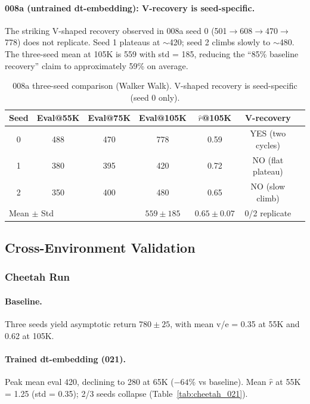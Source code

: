 \documentclass[10pt,letterpaper]{article}
\begin{document}
\paragraph{008a (untrained dt-embedding): V-recovery is seed-specific.}
The striking V-shaped recovery observed in 008a seed 0 (501$\to$608$\to$470$\to$778) does not replicate.
Seed 1 plateaus at $\sim$420; seed 2 climbs slowly to $\sim$480.
The three-seed mean at 105K is 559 with std = 185, reducing the ``85\% baseline recovery'' claim to approximately 59\% on average.

\begin{table}[t]
\centering
\caption{008a three-seed comparison (Walker Walk). V-shaped recovery is seed-specific (seed 0 only).}
\label{tab:008a_seeds}
\small
\begin{tabular}{ccccccl}
\toprule
Seed & Eval@55K & Eval@75K & Eval@105K & $\hat{r}$@105K & V-recovery \\
\midrule
0 & 488 & 470 & 778 & 0.59 & YES (two cycles) \\
1 & 380 & 395 & 420 & 0.72 & NO (flat plateau) \\
2 & 350 & 400 & 480 & 0.65 & NO (slow climb) \\
\midrule
\multicolumn{2}{l}{Mean $\pm$ Std} & & $559 \pm 185$ & $0.65 \pm 0.07$ & 0/2 replicate \\
\bottomrule
\end{tabular}
\end{table}

\subsection{Cross-Environment Validation}\label{sec:cross_env}

\subsubsection{Cheetah Run}

\paragraph{Baseline.}
Three seeds yield asymptotic return $780 \pm 25$, with mean v/e = 0.35 at 55K and 0.62 at 105K.

\paragraph{Trained dt-embedding (021).}
Peak mean eval 420, declining to 280 at 65K ($-64$\% vs baseline).
Mean $\hat{r}$ at 55K = 1.25 (std = 0.35); 2/3 seeds collapse (Table~\ref{tab:cheetah_021}).
\end{document}
